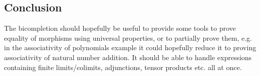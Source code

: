 \documentclass[12pt]{article} %
\theoremstyle{definition}
\theoremstyle{definition}
\theoremstyle{definition}
\theoremstyle{definition}
\begin{document}
\subsection{Conclusion}

The bicompletion should hopefully be useful to provide some tools to prove equality of morphisms using universal properties,
or to partially prove them, e.g. in the associativity of polynomials example it could hopefully reduce it to proving
associativity of natural number addition. It should be able to handle expressions containing finite limits/colimits, adjunctions,
tensor products etc. all at once.
\end{document}
